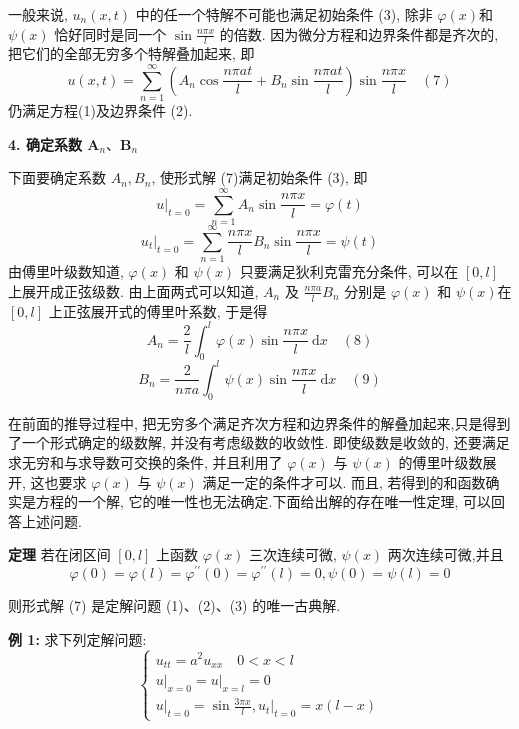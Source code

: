 一般来说, $ u_{n}(x, t) $ 中的任一个特解不可能也满足初始条件 (3), 除非 $ \varphi(x) $和 $ \psi(x) $ 恰好同时是同一个 $ \sin \frac{n \pi x}{l} $ 的倍数. 因为微分方程和边界条件都是齐次的, 把它们的全部无穷多个特解叠加起来, 即
$$
u(x, t)=\sum_{n=1}^{\infty}\left(A_{n} \cos \frac{n \pi a t}{l}+B_{n} \sin \frac{n \pi a t}{l}\right) \sin \frac{n \pi x}{l}\quad(7)
$$
仍满足方程(1)及边界条件 (2).

\textbf{4. 确定系数 $ \boldsymbol{A}_{n} 、 \boldsymbol{B}_{n} $}

下面要确定系数 $ A_{n} , B_{n} $, 使形式解 (7)满足初始条件 (3), 即
$$
\left.u\right|_{t=0}=\sum_{n=1}^{\infty} A_{n} \sin \frac{n \pi x}{l}=\varphi(t) 
$$
$$\left.u_{t}\right|_{t=0}=\sum_{n=1}^{\infty} \frac{n \pi x}{l} B_{n} \sin \frac{n \pi x}{l}=\psi(t)
$$
由傅里叶级数知道, $ \varphi(x) $ 和 $ \psi(x) $ 只要满足狄利克雷充分条件, 可以在 $ [0 ,l]$ 上展开成正弦级数. 由上面两式可以知道, $ A_{n} $ 及 $ \frac{n \pi a}{l} B_{n} $ 分别是 $ \varphi(x) $ 和 $ \psi(x) $在 $ [0, l] $ 上正弦展开式的傅里叶系数, 于是得
$$
A_{n}=\frac{2}{l} \int_{0}^{l} \varphi(x) \sin \frac{n \pi x}{l} \mathrm{~d} x \quad(8)
$$
$$
B_{n}=\frac{2}{n \pi a} \int_{0}^{l} \psi(x) \sin \frac{n \pi x}{l} \mathrm{~d} x\quad(9)
$$

在前面的推导过程中, 把无穷多个满足齐次方程和边界条件的解叠加起来,只是得到了一个形式确定的级数解, 并没有考虑级数的收敛性. 即使级数是收敛的, 还要满足求无穷和与求导数可交换的条件, 并且利用了 $ \varphi(x) $ 与 $ \psi(x) $ 的傅里叶级数展开, 这也要求 $ \varphi(x) $ 与 $ \psi(x) $ 满足一定的条件才可以. 而且, 若得到的和函数确实是方程的一个解, 它的唯一性也无法确定.下面给出解的存在唯一性定理, 可以回答上述问题.


\textbf{定理 }若在闭区间 $ [0, l] $ 上函数 $ \varphi(x) $ 三次连续可微, $ \psi(x) $ 两次连续可微,并且
$$
\varphi(0)=\varphi(l)=\varphi^{\prime \prime}(0)=\varphi^{\prime \prime}(l)=0, \psi(0)=\psi(l)=0
$$

则形式解 (7) 是定解问题 (1)、(2)、(3) 的唯一古典解.

\textbf{例 1: }求下列定解问题:
$$
\left\{\begin{array}{l}
u_{t t}=a^{2} u_{x x} \quad 0<x<l \\
\left.u\right|_{x=0}=\left.u\right|_{x=l}=0 \\
\left.u\right|_{t=0}=\sin \frac{3 \pi x}{l},\left.u_{t}\right|_{t=0}=x(l-x)
\end{array}\right.
$$

